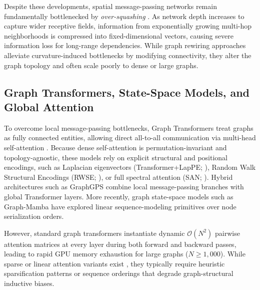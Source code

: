 \documentclass[10pt]{article}
\begin{document}
Despite these developments, spatial message-passing networks remain fundamentally bottlenecked by \textit{over-squashing} \citep{alon2021bottleneck, topping2022understanding}. As network depth increases to capture wider receptive fields, information from exponentially growing multi-hop neighborhoods is compressed into fixed-dimensional vectors, causing severe information loss for long-range dependencies. While graph rewiring approaches \citep{topping2022understanding} alleviate curvature-induced bottlenecks by modifying connectivity, they alter the graph topology and often scale poorly to dense or large graphs.

\subsection{Graph Transformers, State-Space Models, and Global Attention}
To overcome local message-passing bottlenecks, Graph Transformers treat graphs as fully connected entities, allowing direct all-to-all communication via multi-head self-attention \citep{vaswani2017attention, rampasek2022recipe}. Because dense self-attention is permutation-invariant and topology-agnostic, these models rely on explicit structural and positional encodings, such as Laplacian eigenvectors (Transformer+LapPE; \citealt{dwivedi2021laplacian}), Random Walk Structural Encodings (RWSE; \citealt{dwivedi2021graph}), or full spectral attention (SAN; \citealt{kreuzer2021rethinking}). Hybrid architectures such as GraphGPS \citep{rampasek2022recipe} combine local message-passing branches with global Transformer layers. More recently, graph state-space models such as Graph-Mamba \citep{wang2024graphmamba} have explored linear sequence-modeling primitives over node serialization orders.

However, standard graph transformers instantiate dynamic $\mathcal{O}(N^2)$ pairwise attention matrices at every layer during both forward and backward passes, leading to rapid GPU memory exhaustion for large graphs ($N \ge 1{,}000$). While sparse or linear attention variants exist \citep{muller2024attending}, they typically require heuristic sparsification patterns or sequence orderings that degrade graph-structural inductive biases.
\end{document}
